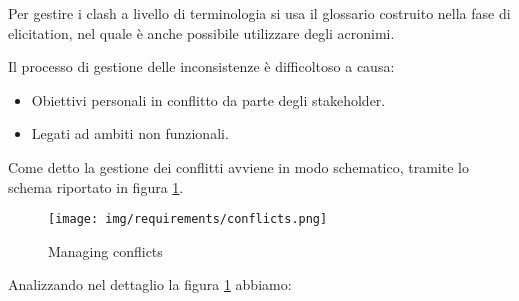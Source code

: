 Per gestire i clash a livello di terminologia si usa il glossario costruito nella
fase di elicitation, nel quale è anche possibile utilizzare degli acronimi.

Il processo di gestione delle inconsistenze è difficoltoso a causa:
\begin{itemize}
    \item Obiettivi personali in conflitto da parte degli stakeholder.
    \item Legati ad ambiti non funzionali.
\end{itemize}
Come detto la gestione dei conflitti avviene in modo schematico, tramite lo
schema riportato in figura \ref{fig:conflicts}.
\begin{figure}[!ht]
    \centering
    \texttt{[image: img/requirements/conflicts.png]}
    \caption{Managing conflicts}
    \label{fig:conflicts}
\end{figure}
Analizzando nel dettaglio la figura \ref{fig:conflicts} abbiamo:

